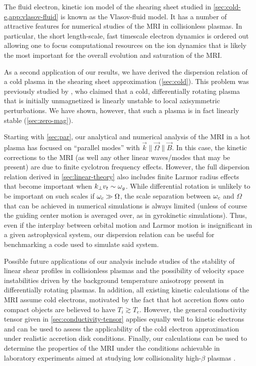 \documentclass[aps,pre,notitlepage,amsmath,amssymb,amsfonts,nobibnotes,nofootinbib,superscriptaddress]{revtex4-1}
\begin{document}
The fluid electron, kinetic ion model of the shearing sheet studied in
\cref{sec:cold-e,app:vlasov-fluid} is known as the Vlasov-fluid model. It has
a number of attractive features for numerical studies of the MRI in
collisionless plasmas. In particular, the short length-scale, fast timescale
electron dynamics is ordered out allowing one to focus computational resources
on the ion dynamics that is likely the most important for the overall
evolution and saturation of the MRI\@.

As a second application of our results, we have derived the dispersion
relation of a cold plasma in the shearing sheet approximation
(\cref{sec:cold}). This problem was previously studied by \citet{Krolik2006},
who claimed that a cold, differentially rotating plasma that is initially
unmagnetized is linearly unstable to local axisymmetric perturbations. We have
shown, however, that such a plasma is in fact linearly stable
(\cref{sec:zero-mag}).

Starting with \cref{sec:par}, our analytical and numerical analysis of the MRI
in a hot plasma has focused on ``parallel modes'' with
$\vec{k}\parallel\vec{\Omega}\parallel\vec{B}$. In this case, the kinetic
corrections to the MRI (as well any other linear waves/modes that may be
present) are due to finite cyclotron frequency effects. However, the full
dispersion relation derived in \cref{sec:linear-theory} also includes finite
Larmor radius effects that become important when $k_\perp v_t\sim\omega_g$. While
differential rotation is unlikely to be important on such scales if
$\omega_c\gg\Omega$, the scale separation between $\omega_c$ and $\Omega$ that can be
achieved in numerical simulations is always limited (unless of course the
guiding center motion is averaged over, as in gyrokinetic simulations). Thus,
even if the interplay between orbital motion and Larmor motion is
insignificant in a given astrophysical system, our dispersion relation can be
useful for benchmarking a code used to simulate said system.

Possible future applications of our analysis include studies of the stability
of linear shear profiles in collisionless plasmas and the possibility of
velocity space instabilities driven by the background temperature anisotropy
present in differentially rotating plasmas.  In addition, all existing kinetic
calculations of the MRI assume cold electrons, motivated by the fact that hot
accretion flows onto compact objects are believed to have $T_i\gtrsim{}T_e$.
However, the general conductivity tensor given in
\cref{sec:conductivity-tensor} applies equally well to kinetic electrons and
can be used to assess the applicability of the cold electron approximation
under realistic accretion disk conditions.  Finally, our calculations can be
used to determine the properties of the MRI under the conditions achievable in
laboratory experiments aimed at studying low collisionality high-$\beta$
plasmas \citep[e.g.][]{Collins2012}.
\end{document}
